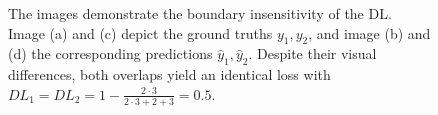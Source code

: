 \begin{figure}[H]
  \caption[Boundary insensitivity of \ac{DL}]{The images demonstrate the boundary insensitivity of the \ac{DL}. Image (a) and (c) depict the ground truths $y_1,y_2$, and image (b) and (d) the corresponding predictions $\hat{y}_1,\hat{y}_2$. Despite their visual differences, both overlaps yield an identical loss with $DL_1=DL_2=1-\frac{2\cdot 3}{2\cdot 3 + 2 + 3}= 0.5$.}
  \label{dice_limit_2}
\end{figure}
